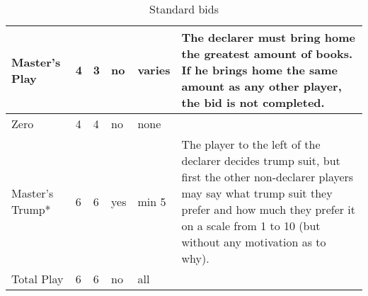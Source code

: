 \begin{table}
\begin{center}
{\begin{tabular}{ p{2.0cm} | p{1.0cm} | p{1.0cm} | p{1.0cm} | p{1.0cm} | p{3.5cm} }
				\hline
					Master's Play &
					4 & 3 & no & varies &
					The declarer must bring home the greatest amount of books. If he brings home the same amount as any other player, the bid is not completed. \\
				\hline
					Zero &
					4 & 4 & no & none &
					\\
				\hline
					Master's Trump* &
					6 & 6 & yes & min 5 &
					The player to the left of the declarer decides trump suit, but first the other non-declarer players may say what trump suit they prefer and how much they prefer it on a scale from 1 to 10 (but without any motivation as to why). \\
				\hline
					Total Play &
					6 & 6 & no & all &
			\end{tabular}
		}
	\end{center}
	\caption{Standard bids}
	\label{tab:standardBids}
\end{table}
